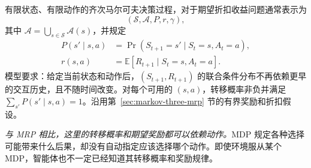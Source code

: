\documentclass[UTF8,12pt,a4paper,fontset=fandol]{ctexart}
\begin{document}
\begin{definition}[马尔可夫决策过程]
有限状态、有限动作的齐次马尔可夫决策过程，对于期望折扣收益问题通常表示为
\[
  (\mathcal S,\mathcal A,P,r,\gamma),
\]
其中 $\mathcal A=\bigcup_{s\in\mathcal S}\mathcal A(s)$，并规定
\begin{equation}
  \begin{aligned}
    P(s'\mid s,a)&=\Pr(S_{t+1}=s'\mid S_t=s,A_t=a),\\
    r(s,a)&=\mathbb E[R_{t+1}\mid S_t=s,A_t=a].
  \end{aligned}
  \label{eq:markov-three-mdp-model}
\end{equation}
模型要求：给定当前状态和动作后，$(S_{t+1},R_{t+1})$ 的联合条件分布不再依赖更早的交互历史，且不随时间改变。对每个可用的 $(s,a)$，转移概率非负并满足 $\sum_{s'}P(s'\mid s,a)=1$。沿用第~\ref{sec:markov-three-mrp} 节的有界奖励和折扣假设。
\end{definition}

\emph{与 MRP 相比，这里的转移概率和期望奖励都可以依赖动作。}MDP 规定各种选择可能带来什么后果，却没有自动指定应该选择哪个动作。即使环境服从某个 MDP，智能体也不一定已经知道其转移概率和奖励规律。
\end{document}
